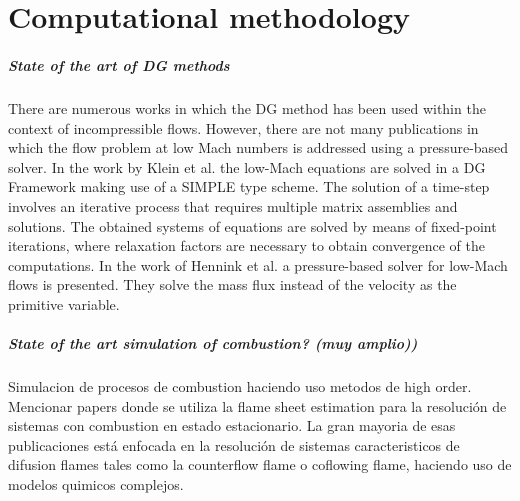 \chapter{Computational methodology} \label{ch:CompMethodology}
%
\paragraph{State of the art of DG methods}
There are numerous works in which the DG method has been used within the context of incompressible flows. \textcite{shahbaziHighorderDiscontinuousGalerkin2007,kummerBoSSSDiscontinuousGalerkin2012,kleinSIMPLEBasedDiscontinuous2013}  However, there are not many publications in which the flow problem at low Mach numbers is addressed using a pressure-based solver. In the work by Klein et al. \textcite{kleinHighorderDiscontinuousGalerkin2016} the low-Mach equations are solved in a DG Framework making use of a SIMPLE type scheme. The solution of a time-step involves an iterative process that requires multiple matrix assemblies and solutions. The obtained systems of equations are solved by means of fixed-point iterations, where relaxation factors are necessary to obtain convergence of the computations.
In the work of Hennink et al. \textcite{henninkPressurebasedSolverLowMach2021} a pressure-based solver for low-Mach flows is presented. They solve  the mass flux instead of the velocity as the primitive variable.



\paragraph{State of the art simulation of combustion? (muy amplio))}
Simulacion de procesos de combustion haciendo uso metodos de high order. Mencionar papers donde se utiliza la flame sheet estimation para la resolución de sistemas con combustion en estado estacionario. La gran mayoria de esas publicaciones está enfocada en la resolución de sistemas caracteristicos de difusion flames tales como la counterflow flame o coflowing flame, haciendo uso de modelos quimicos complejos. 



